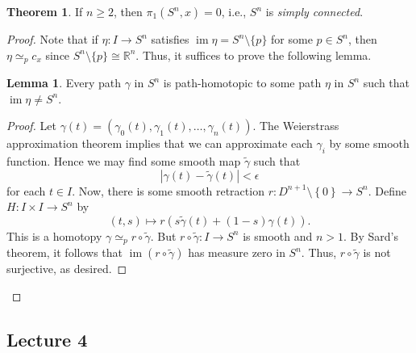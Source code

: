 \documentclass[10pt,letterpaper,cm]{nupset}
\theoremstyle{definition}
\theoremstyle{theorem}
\newtheorem{theorem}[definition]{Theorem}
\newtheorem{lemma}[definition]{Lemma}
\theoremstyle{remark}
\newcommand{\R}{\mathbb{R}}
\newcommand{\1}{\mathbb{1}}
\newcommand{\0}{\vec 0}
\DeclareMathOperator{\im}{im}
\begin{document}
\begin{theorem}
If $n\geq 2$, then $\pi_1(S^n, x) =0$, i.e., $S^n$ is \textit{simply connected}.
\end{theorem}
\begin{proof}
Note that if $\eta : I \to S^n$ satisfies $\im{\eta} = S^n \setminus \{p\}$ for some $p\in S^n$, then $\eta \simeq_p c_x$ since $S^n \setminus \{p\} \cong \R^n$. Thus, it suffices to prove the following lemma.
\begin{lemma}
Every path $\gamma$ in $S^n$ is path-homotopic to some path $\eta$ in $S^n$ such that $\im{\eta} \ne S^n$.
\end{lemma}
\begin{proof}
Let $\gamma(t) = \left(\gamma_0(t), \gamma_1(t), \ldots, \gamma_n(t)\right)$. The Weierstrass approximation theorem implies that we can approximate each $\gamma_i$ by some smooth function. Hence we may find some smooth map $\tilde{\gamma}$ such that $$\left\lvert{\gamma(t) - \tilde{\gamma}(t)}\right\rvert <\epsilon$$ for each $t\in I$. Now, there is some smooth retraction $r: D^{n+1}\setminus \left\{0\right\} \to S^n$. Define $H : I \times I \to S^n$ by $$\left(t, s\right) \mapsto r(s\tilde{\gamma}(t) + \left(1-s\right)\gamma(t)).$$ This is a homotopy $\gamma \simeq_p r\circ \tilde{\gamma}$. But $r\circ \tilde{\gamma} : I \to S^n$ is smooth and $n>1$. By Sard's theorem, it follows that $\im(r\circ \tilde{\gamma})$ has measure zero in $S^n$. Thus, $r\circ \tilde{\gamma}$ is not surjective, as desired. 
\end{proof}
\end{proof}

\subsection{Lecture 4}
\end{document}
